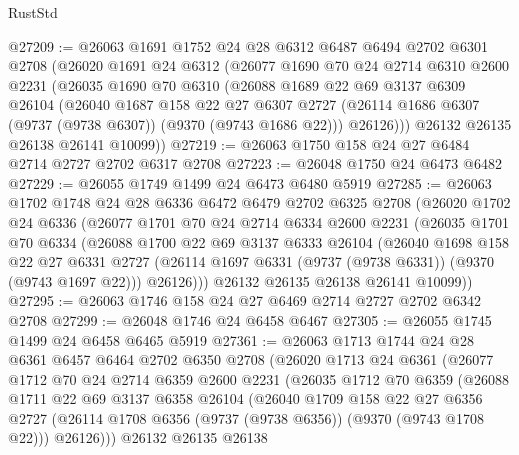 \begin{lexlean}{RustStd}
\begin{coremodule}
{\begin{coremodule}
{{{{{{{{{{{{{{{{{{{{{{{{{{{{{{{{{{{{{{{@27209 := @26063
    @1691
    @1752
    @24
    @28
    @6312
    @6487
    @6494
    @2702
    @6301
    @2708
    (@26020
      @1691
      @24
      @6312
      (@26077
        @1690
        @70
        @24
        @2714
        @6310
        @2600
        @2231
        (@26035
          @1690
          @70
          @6310
          (@26088
            @1689
            @22
            @69
            @3137
            @6309
            @26104
            (@26040
              @1687
              @158
              @22
              @27
              @6307
              @2727
              (@26114 @1686 @6307 (@9737 (@9738 @6307)) (@9370 (@9743 @1686 @22)))
              @26126)))
        @26132
        @26135
        @26138
        @26141
        @10099))
@27219 := @26063 @1750 @158 @24 @27 @6484 @2714 @2727 @2702 @6317 @2708
@27223 := @26048 @1750 @24 @6473 @6482
@27229 := @26055 @1749 @1499 @24 @6473 @6480 @5919
@27285 := @26063
    @1702
    @1748
    @24
    @28
    @6336
    @6472
    @6479
    @2702
    @6325
    @2708
    (@26020
      @1702
      @24
      @6336
      (@26077
        @1701
        @70
        @24
        @2714
        @6334
        @2600
        @2231
        (@26035
          @1701
          @70
          @6334
          (@26088
            @1700
            @22
            @69
            @3137
            @6333
            @26104
            (@26040
              @1698
              @158
              @22
              @27
              @6331
              @2727
              (@26114 @1697 @6331 (@9737 (@9738 @6331)) (@9370 (@9743 @1697 @22)))
              @26126)))
        @26132
        @26135
        @26138
        @26141
        @10099))
@27295 := @26063 @1746 @158 @24 @27 @6469 @2714 @2727 @2702 @6342 @2708
@27299 := @26048 @1746 @24 @6458 @6467
@27305 := @26055 @1745 @1499 @24 @6458 @6465 @5919
@27361 := @26063
    @1713
    @1744
    @24
    @28
    @6361
    @6457
    @6464
    @2702
    @6350
    @2708
    (@26020
      @1713
      @24
      @6361
      (@26077
        @1712
        @70
        @24
        @2714
        @6359
        @2600
        @2231
        (@26035
          @1712
          @70
          @6359
          (@26088
            @1711
            @22
            @69
            @3137
            @6358
            @26104
            (@26040
              @1709
              @158
              @22
              @27
              @6356
              @2727
              (@26114 @1708 @6356 (@9737 (@9738 @6356)) (@9370 (@9743 @1708 @22)))
              @26126)))
        @26132
        @26135
        @26138
}}}}}}}}}}}}}}}}}}}}}}}}}}}}}}}}}}}}}}}
\end{coremodule}}
\end{coremodule}
\end{lexlean}
